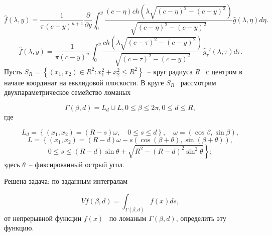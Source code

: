 \bigskip

\begin{equation*}
\widehat  f\left(\lambda ,y\right)=\frac 1{\pi \left(c-y\right)^{n+1}}\frac{{\partial}}{{\partial}y}\int
_0^y\frac{\left(c-\eta \right)\mathit{ch}\left(\lambda \sqrt{\left(c-\eta
		\right)^2-\left(c-y\right)^2}\right)}{\sqrt{\left(c-\eta \right)^2-\left(c-y\right)^2}}\widehat  g\left(\lambda ,\eta
\right)\mathit{d\eta }.
\end{equation*}
\begin{equation*}
\widehat  f\left(\lambda ,y\right)=\frac 1{\pi \left(c-y\right)^n}\int _0^y\frac{\mathit{ch}\left(\lambda
	\sqrt{\left(c-\tau \right)^2-\left(c-y\right)^2}\right)}{\sqrt{\left(c-\tau \right)^2-\left(c-y\right)^2}}\widehat
g_{\tau }'\left(\lambda ,\tau \right)d\tau .
\end{equation*}
Пусть  $S_R=\left\{\left(x_1,x_2\right){\in}R^2:x_1^2+x_2^2{\leq}R^2\right\}$\ – круг радиуса  $R$ \ с центром в
начале координат на евклидовой плоскости. В круге  $S_R$ \ рассмотрим двухпараметрическое семейство ломаных

\begin{equation*}
\Gamma \left(\beta ,d\right)=L_d{\cup}L,0{\leq}\beta {\leq}2\pi ,0{\leq}d{\leq}R,
\end{equation*}
где

\begin{equation*}
L_d=\left\{\left(x_1,x_2\right)=\left(R-s\right)\omega ,\quad 0{\leq}s{\leq}d\right\},\quad \omega
=(\cos \beta ,\sin \beta ),
\end{equation*}
\begin{equation*}
L=\left\{\left(x_1,x_2\right)=\left(R-d\right)\omega -s\left(\cos \left(\beta +\theta \right),\sin \left(\beta +\theta
\right)\right),\right.
\end{equation*}
\begin{equation*}
\left.0{\leq}s{\leq}\left(R-d\right)\sin \theta +\sqrt{R^2-\left(R-d\right)^2\sin ^2\theta }\right\};
\end{equation*}
здесь  $\theta $\ – фиксированный острый угол.

Решена задача: по заданным интегралам

\begin{equation*}
\mathit{Vf}\left(\beta ,d\right)=\int _{\Gamma \left(\beta ,d\right)}^{}f(x)\mathit{ds},
\end{equation*}
от непрерывной функции  $f(x)$ \ по ломаным  $\Gamma \left(\beta ,d\right)$, определить эту функцию.

